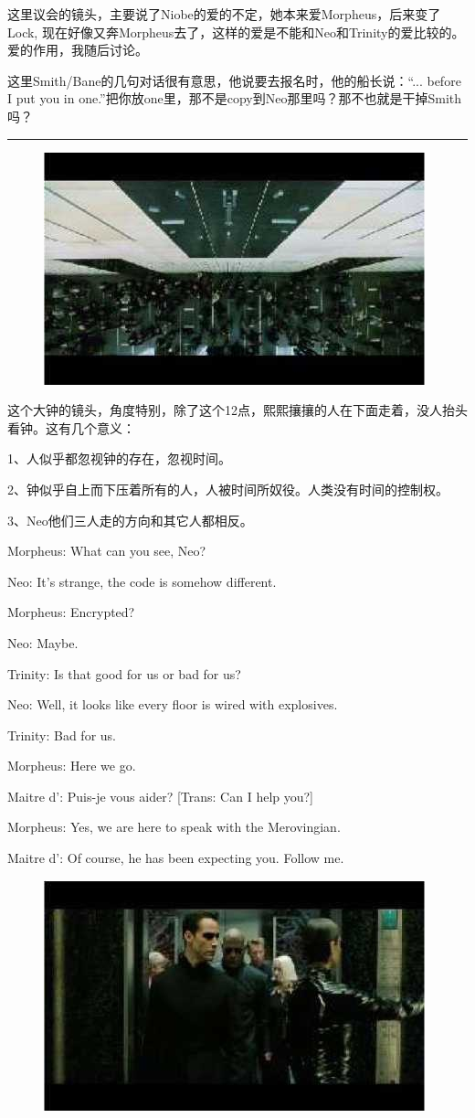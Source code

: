 \documentclass{ctexart}
\newcommand{\myparsep}{\noindent \rule[0.5ex]{\linewidth}{1pt}}
\newenvironment{myquote}{\color{green} \setlength{\leftskip}{6em} \setlength{\rightskip}{4em} \setlength{\parindent}{-2em}}{\par}
\begin{document}
这里议会的镜头，主要说了Niobe的爱的不定，她本来爱Morpheus，后来变了Lock, 现在好像又奔Morpheus去了，这样的爱是不能和Neo和Trinity的爱比较的。爱的作用，我随后讨论。

这里Smith/Bane的几句对话很有意思，他说要去报名时，他的船长说：“... before I put you in one.”把你放one里，那不是copy到Neo那里吗？那不也就是干掉Smith吗？

\myparsep

\begin{figure}[htb]
\centering
\includegraphics[width=0.5\linewidth]{fig/read_reloaded-86}
\end{figure}

这个大钟的镜头，角度特别，除了这个12点，熙熙攘攘的人在下面走着，没人抬头看钟。这有几个意义：

1、人似乎都忽视钟的存在，忽视时间。

2、钟似乎自上而下压着所有的人，人被时间所奴役。人类没有时间的控制权。

3、Neo他们三人走的方向和其它人都相反。

\begin{myquote}
Morpheus: What can you see, Neo?

Neo: It's strange, the code is somehow different.

Morpheus: Encrypted?

Neo: Maybe.

Trinity: Is that good for us or bad for us?

Neo: Well, it looks like every floor is wired with explosives.

Trinity: Bad for us.

Morpheus: Here we go.

Maitre d': Puis-je vous aider? [Trans: Can I help you?]

Morpheus: Yes, we are here to speak with the Merovingian.

Maitre d': Of course, he has been expecting you. Follow me.
\end{myquote}

\begin{figure}[htb]
\centering
\includegraphics[width=0.5\linewidth]{fig/read_reloaded-87}
\end{figure}
\end{document}
